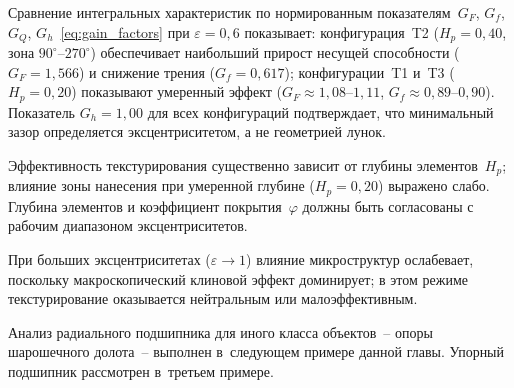 Сравнение интегральных характеристик по нормированным
показателям~$G_F$, $G_f$, $G_Q$, $G_h$~\eqref{eq:gain_factors}
при $\varepsilon = 0{,}6$ показывает: конфигурация~T2
($H_p = 0{,}40$, зона $90^{\circ}$--$270^{\circ}$) обеспечивает
наибольший прирост несущей способности ($G_F = 1{,}566$)
и снижение трения ($G_f = 0{,}617$); конфигурации~T1
и~T3 ($H_p = 0{,}20$) показывают умеренный эффект
($G_F \approx 1{,}08$--$1{,}11$, $G_f \approx 0{,}89$--$0{,}90$).
Показатель $G_h = 1{,}00$ для всех конфигураций подтверждает,
что минимальный зазор определяется эксцентриситетом, а не
геометрией лунок.

Эффективность текстурирования существенно зависит от глубины
элементов~$H_p$; влияние зоны нанесения при умеренной глубине
($H_p = 0{,}20$) выражено слабо. Глубина элементов
и коэффициент покрытия~$\varphi$ должны быть согласованы
с рабочим диапазоном эксцентриситетов.

При больших эксцентриситетах ($\varepsilon \to 1$) влияние
микроструктур ослабевает, поскольку макроскопический клиновой
эффект доминирует; в этом режиме текстурирование оказывается
нейтральным или малоэффективным.

Анализ радиального подшипника для иного класса объектов~--
опоры шарошечного долота~-- выполнен в~следующем примере данной главы. Упорный
подшипник рассмотрен в~третьем примере.
